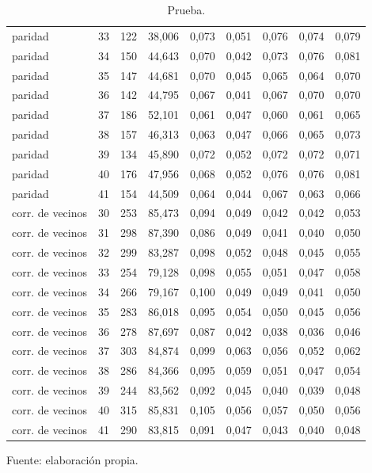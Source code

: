\begin{table}[htbp]
{\begin{tabular}{@{}lrrrrrrrr@{}}
        paridad & 33 & 122 & 38,006 & 0,073 & 0,051 & 0,076 & 0,074 & 0,079 \\
        paridad & 34 & 150 & 44,643 & 0,070 & 0,042 & 0,073 & 0,076 & 0,081 \\
        paridad & 35 & 147 & 44,681 & 0,070 & 0,045 & 0,065 & 0,064 & 0,070 \\
        paridad & 36 & 142 & 44,795 & 0,067 & 0,041 & 0,067 & 0,070 & 0,070 \\
        paridad & 37 & 186 & 52,101 & 0,061 & 0,047 & 0,060 & 0,061 & 0,065 \\
        paridad & 38 & 157 & 46,313 & 0,063 & 0,047 & 0,066 & 0,065 & 0,073 \\
        paridad & 39 & 134 & 45,890 & 0,072 & 0,052 & 0,072 & 0,072 & 0,071 \\
        paridad & 40 & 176 & 47,956 & 0,068 & 0,052 & 0,076 & 0,076 & 0,081 \\
        paridad & 41 & 154 & 44,509 & 0,064 & 0,044 & 0,067 & 0,063 & 0,066 \\
        corr. de vecinos & 30 & 253 & 85,473 & 0,094 & 0,049 & 0,042 & 0,042 & 0,053 \\
        corr. de vecinos & 31 & 298 & 87,390 & 0,086 & 0,049 & 0,041 & 0,040 & 0,050 \\
        corr. de vecinos & 32 & 299 & 83,287 & 0,098 & 0,052 & 0,048 & 0,045 & 0,055 \\
        corr. de vecinos & 33 & 254 & 79,128 & 0,098 & 0,055 & 0,051 & 0,047 & 0,058 \\
        corr. de vecinos & 34 & 266 & 79,167 & 0,100 & 0,049 & 0,049 & 0,041 & 0,050 \\
        corr. de vecinos & 35 & 283 & 86,018 & 0,095 & 0,054 & 0,050 & 0,045 & 0,056 \\
        corr. de vecinos & 36 & 278 & 87,697 & 0,087 & 0,042 & 0,038 & 0,036 & 0,046 \\
        corr. de vecinos & 37 & 303 & 84,874 & 0,099 & 0,063 & 0,056 & 0,052 & 0,062 \\
        corr. de vecinos & 38 & 286 & 84,366 & 0,095 & 0,059 & 0,051 & 0,047 & 0,054 \\
        corr. de vecinos & 39 & 244 & 83,562 & 0,092 & 0,045 & 0,040 & 0,039 & 0,048 \\
        corr. de vecinos & 40 & 315 & 85,831 & 0,105 & 0,056 & 0,057 & 0,050 & 0,056 \\
        corr. de vecinos & 41 & 290 & 83,815 & 0,091 & 0,047 & 0,043 & 0,040 & 0,048 \\
        \bottomrule
    \end{tabular}}

    \caption{Prueba.}
    \label{tab:e_tiempo_mae_f}

    {\footnotesize Fuente: elaboración propia.}
\end{table}
